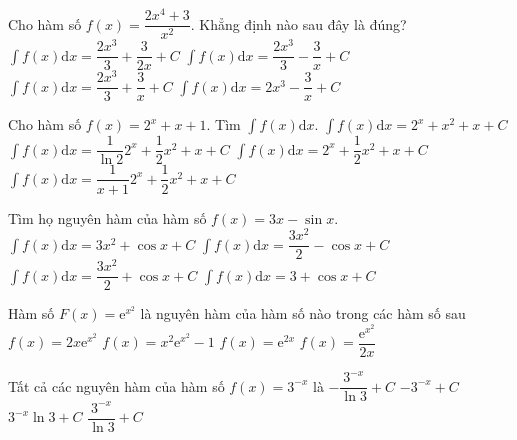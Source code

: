 \begin{ex}
	Cho hàm số $ f(x)=\dfrac{2x^4+3}{x^2}$. Khẳng định nào sau đây là đúng?
	\choice
	{$\displaystyle\int{f(x)\mathrm{d}x=\dfrac{2x^3}{3}+\dfrac{3}{2x}+C}$}
	{\True $\displaystyle\int{f(x)\mathrm{d}x=\dfrac{2x^3}{3}-\dfrac{3}{x}+C}$}
	{$\displaystyle\int{f(x)\mathrm{d}x=\dfrac{2x^3}{3}+\dfrac{3}{x}+C}$}
	{$\displaystyle\int{f(x)\mathrm{d}x=2x^3-\dfrac{3}{x}+C}$}
\end{ex}
\begin{ex}
	Cho hàm số $f(x)=2^x+x+1$. Tìm $\displaystyle\int{f(x)\mathrm{d}x}$.
	\choice
	{$\displaystyle\int{f(x)\mathrm{d}x}=2^x+x^2+x+C$}
	{\True $\displaystyle\int{f(x)\mathrm{d}x}=\dfrac{1}{\ln 2}{2^x}+\dfrac{1}{2}{x^2}+x+C$}
	{$\displaystyle\int{f(x)\mathrm{d}x}=2^x+\dfrac{1}{2}{x^2}+x+C$}
	{$\displaystyle\int{f(x)\mathrm{d}x}=\dfrac{1}{x+1}{2^x}+\dfrac{1}{2}{x^2}+x+C$}
\end{ex}
\begin{ex}
	Tìm họ nguyên hàm của hàm số $ f(x)=3x-\sin x$.
	\choice
	{$\displaystyle\int{f(x)}\mathrm{d}x=3x^2+\cos x+C$}
	{$\displaystyle\int{f(x)}\mathrm{d}x=\dfrac{3x^2}{2}-\cos x+C$}
	{\True $\displaystyle\int{f(x)}\mathrm{d}x=\dfrac{3x^2}{2}+\cos x+C$}
	{$\displaystyle\int{f(x)}\mathrm{d}x=3+\cos x+C$}
\end{ex}
\begin{ex}
	Hàm số $ F(x)=\mathrm{e}^{x^2}$ là nguyên hàm của hàm số nào trong các hàm số sau
	\choice
	{\True $ f(x)=2x{\mathrm{e}^{x^2}}$}
	{$ f(x)=x^2\mathrm{e}^{x^2}-1$}
	{$ f(x)=\mathrm{e}^{2x}$}
	{$ f(x)=\dfrac{\mathrm{e}^{x^2}}{2x}$}
\end{ex}
\begin{ex}
	Tất cả các nguyên hàm của hàm số $ f(x)=3^{-x}$ là
	\choice
	{\True $-\dfrac{3^{-x}}{\ln 3}+C$}
	{$-3^{-x}+C$}
	{$3^{-x}\ln 3+C$}
	{$\dfrac{3^{-x}}{\ln 3}+C$}
\end{ex}
